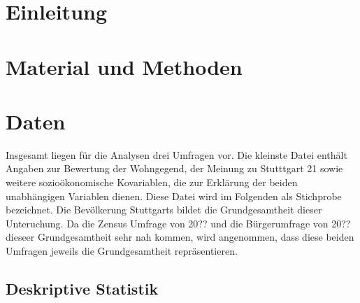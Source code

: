 \documentclass{Vorlage}
\begin{document}
\restoregeometry


\pagestyle{plain}

\tableofcontents %

\newpage %

\listoffigures %

\listoftables %

\newpage



\pagestyle{fancy}

\section{Einleitung}

\newpage

\section{Material und Methoden}
\section{Daten}
Insgesamt liegen für die Analysen drei Umfragen vor. Die kleinste Datei enthält Angaben zur Bewertung der Wohngegend, der Meinung zu Stutttgart 21 sowie weitere sozioökonomische Kovariablen, die zur Erklärung der beiden unabhängigen Variablen dienen. Diese Datei wird im Folgenden als Stichprobe bezeichnet. Die Bevölkerung Stuttgarts bildet die Grundgesamtheit dieser Unteruchung. Da die Zensus Umfrage von 20?? und die Bürgerumfrage von 20?? dieseer Grundgesamtheit sehr nah kommen, wird angenommen, dass diese beiden Umfragen jeweils die Grundgesamtheit repräsentieren.




\subsection{Deskriptive Statistik}
\end{document}
